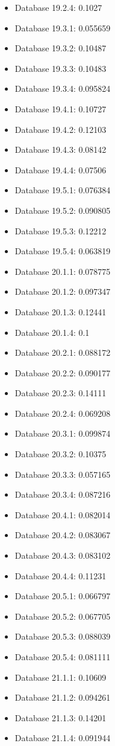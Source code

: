 \begin{itemize}
\item Database 19.2.4: 0.1027
\item Database 19.3.1: 0.055659
\item Database 19.3.2: 0.10487
\item Database 19.3.3: 0.10483
\item Database 19.3.4: 0.095824
\item Database 19.4.1: 0.10727
\item Database 19.4.2: 0.12103
\item Database 19.4.3: 0.08142
\item Database 19.4.4: 0.07506
\item Database 19.5.1: 0.076384
\item Database 19.5.2: 0.090805
\item Database 19.5.3: 0.12212
\item Database 19.5.4: 0.063819
\item Database 20.1.1: 0.078775
\item Database 20.1.2: 0.097347
\item Database 20.1.3: 0.12441
\item Database 20.1.4: 0.1
\item Database 20.2.1: 0.088172
\item Database 20.2.2: 0.090177
\item Database 20.2.3: 0.14111
\item Database 20.2.4: 0.069208
\item Database 20.3.1: 0.099874
\item Database 20.3.2: 0.10375
\item Database 20.3.3: 0.057165
\item Database 20.3.4: 0.087216
\item Database 20.4.1: 0.082014
\item Database 20.4.2: 0.083067
\item Database 20.4.3: 0.083102
\item Database 20.4.4: 0.11231
\item Database 20.5.1: 0.066797
\item Database 20.5.2: 0.067705
\item Database 20.5.3: 0.088039
\item Database 20.5.4: 0.081111
\item Database 21.1.1: 0.10609
\item Database 21.1.2: 0.094261
\item Database 21.1.3: 0.14201
\item Database 21.1.4: 0.091944

\end{itemize}
